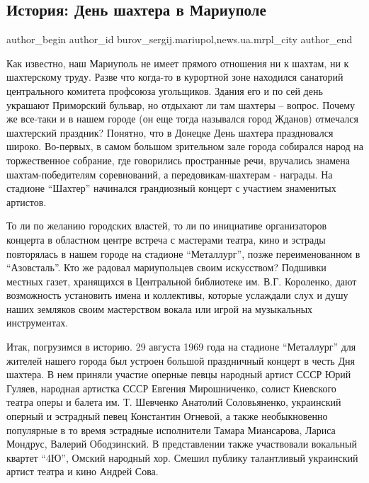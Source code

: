  
 
 
 
 
 
\subsection{История: День шахтера в Мариуполе}
\label{sec:27_08_2017.stz.news.ua.mrpl_city.1.istoria_den_shahtera_v_mariupole}
 
\ifcmt
 author_begin
   author_id burov_sergij.mariupol,news.ua.mrpl_city
 author_end
\fi

Как известно, наш Мариуполь не имеет прямого отношения ни к шахтам, ни к
шахтерскому труду. Разве что когда-то в курортной зоне находился санаторий
центрального комитета профсоюза угольщиков. Здания его и по сей день украшают
Приморский бульвар, но отдыхают ли там шахтеры – вопрос. Почему же все-таки и в
нашем городе (он еще тогда назывался город Жданов) отмечался шахтерский
праздник? Понятно, что в Донецке День шахтера праздновался широко. Во-первых,
в самом большом зрительном зале города собирался народ на торжественное
собрание, где говорились пространные речи, вручались знамена шахтам-победителям
соревнований, а передовикам-шахтерам - награды. На стадионе \enquote{Шахтер} начинался
грандиозный концерт с участием знаменитых артистов.

То ли по желанию городских властей, то ли по инициативе организаторов концерта
в областном центре встреча с мастерами театра, кино и эстрады повторялась в
нашем городе на стадионе \enquote{Металлург}, позже переименованном в \enquote{Азовсталь}. Кто
же  радовал мариупольцев своим искусством? Подшивки местных газет, хранящихся в
Центральной  библиотеке им. В.Г. Короленко, дают возможность установить имена и
коллективы, которые услаждали слух и душу наших земляков своим мастерством
вокала или игрой на музыкальных инструментах.

Итак, погрузимся в историю. 29 августа 1969 года на стадионе \enquote{Металлург} для
жителей нашего города был устроен большой праздничный концерт в честь Дня
шахтера. В нем приняли участие оперные певцы народный артист СССР Юрий  Гуляев,
народная артистка СССР Евгения Мирошниченко, солист Киевского театра оперы и
балета им. Т. Шевченко  Анатолий Соловьяненко, украинский оперный и эстрадный
певец Константин Огневой, а также необыкновенно популярные в то время эстрадные
исполнители Тамара Миансарова, Лариса Мондрус, Валерий Ободзинский. В
представлении также участвовали  вокальный квартет \enquote{4Ю}, Омский народный хор.
Смешил публику талантливый украинский артист театра и кино Андрей Сова.

